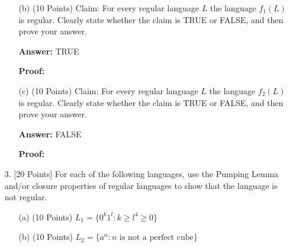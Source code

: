 \documentclass[12pt]{article}
\begin{document}
\begin{spacing}{1.5}
\begin{enumerate}
\begin{enumerate}
                        \item[(b)] (10 Points) Claim: For every regular language $L$ the language $f_1(L)$ is regular. Clearly state whether the claim is TRUE or FALSE, and then prove your answer.

                              \textbf{Answer:} TRUE

                              \textbf{Proof:}

                        \item[(c)] (10 Points) Claim: For every regular language $L$ the language $f_2(L)$ is regular. Clearly state whether the claim is TRUE or FALSE, and then prove your answer.

                              \textbf{Answer:} FALSE

                              \textbf{Proof:}
                  \end{enumerate}

                  \newpage
            \item[3.] [20 Points] For each of the following languages, use the Pumping Lemma and/or closure properties of regular languages to show that the language is not regular.

                  \begin{enumerate}
                        \item[(a)] (10 Points) $L_1=\{0^k1^l : k \geq l^4 \geq 0\}$

                        \item[(b)] (10 Points) $L_2=\{a^n : n \text{ is not a perfect cube}\}$
                  \end{enumerate}

      \end{enumerate}

\end{spacing}
\end{document}
